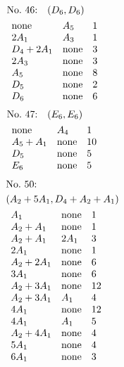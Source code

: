 %
%
\begin{align*}
&\hbox to 4cm {\textrm{No.~46:}\quad$(D_{6}, D_{6})$\hss}\\ 
&\begin{array}{lll}
\none & A_{5} & 1\\
2A_{1} & A_{3} & 1\\
D_{4}+2A_{1} & \none & 3\\
2A_{3} & \none & 3\\
A_{5} & \none & 8\\
D_{5} & \none & 2\\
D_{6} & \none & 6\\
\end{array}
\end{align*}
%
%
\begin{align*}
&\hbox to 4cm {\textrm{No.~47:}\quad$(E_{6}, E_{6})$\hss}\\ 
&\begin{array}{lll}
\none & A_{4} & 1\\
A_{5}+A_{1} & \none & 10\\
D_{5} & \none & 5\\
E_{6} & \none & 5\\
\end{array}
\end{align*}
%
%
\begin{align*}
&\hbox to 4cm {\textrm{No.~50:}\quad\hss}\\ 
&(A_{2}+5A_{1}, D_{4}+A_{2}+A_{1})\\ 
&\begin{array}{lll}
A_{1} & \none & 1\\
A_{2}+A_{1} & \none & 1\\
A_{2}+A_{1} & 2A_{1} & 3\\
2A_{1} & \none & 1\\
A_{2}+2A_{1} & \none & 6\\
3A_{1} & \none & 6\\
A_{2}+3A_{1} & \none & 12\\
A_{2}+3A_{1} & A_{1} & 4\\
4A_{1} & \none & 12\\
4A_{1} & A_{1} & 5\\
A_{2}+4A_{1} & \none & 4\\
5A_{1} & \none & 4\\
6A_{1} & \none & 3\\
\end{array}
\end{align*}
%
%
